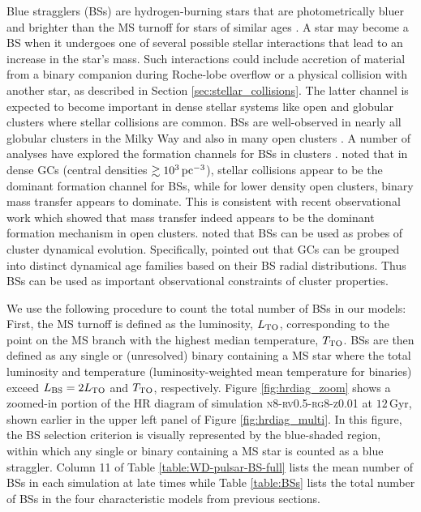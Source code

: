 \documentclass[twocolumn,tighten]{aastex63}
\begin{document}
Blue stragglers (BSs) are hydrogen-burning stars that are photometrically bluer and brighter than the MS turnoff for stars of similar ages \citep{Sandage1953}. A star may become a BS when it undergoes one of several possible stellar interactions that lead to an increase in the star's mass. Such interactions could include accretion of material from a binary companion during Roche-lobe overflow or a physical collision with another star, as described in Section \ref{sec:stellar_collisions}. The latter channel is expected to become important in dense stellar systems like open and globular clusters where stellar collisions are common. BSs are well-observed in nearly all globular clusters in the Milky Way \citep[e.g.,][]{Piotto2003,Ferraro2012} and also in many open clusters \citep[e.g.,][]{MathieuGeller2009}. A number of analyses have explored the formation channels for BSs in clusters \citep[e.g.][]{Ferraro2012,Chatterjee2013b,Hypki2017}. \citet{Chatterjee2013b} noted that in dense GCs (central densities $\gtrsim 10^3\,\rm{pc}^{-3}$), stellar collisions appear to be the dominant formation channel for BSs, while for lower density open clusters, binary mass transfer appears to dominate. This is consistent with recent observational work \citep[e.g.,][]{Geller2011,Gosnell2019} which showed that mass transfer indeed appears to be the dominant formation mechanism in open clusters. \citet{Ferraro2012} noted that BSs can be used as probes of cluster dynamical evolution. Specifically, \citet{Ferraro2012} pointed out that GCs can be grouped into distinct dynamical age families based on their BS radial distributions. Thus BSs can be used as important observational constraints of cluster properties.


We use the following procedure to count the total number of BSs in our models: First, the MS turnoff is defined as the luminosity, $L_{\rm{TO}}$, corresponding to the point on the MS branch with the highest median temperature, $T_{\rm{TO}}$. BSs are then defined as any single or (unresolved) binary containing a MS star where the total luminosity and temperature (luminosity-weighted mean temperature for binaries) exceed $L_{\rm{BS}} = 2 L_{\rm{TO}}$ and $T_{\rm{TO}}$, respectively. Figure \ref{fig:hrdiag_zoom} shows a zoomed-in portion of the HR diagram of simulation \textsc{n8-rv0.5-rg8-z0.01} at $12\,$Gyr, shown earlier in the upper left panel of Figure \ref{fig:hrdiag_multi}. In this figure, the BS selection criterion is visually represented by the blue-shaded region, within which any single or binary containing a MS star is counted as a blue straggler. Column 11 of Table \ref{table:WD-pulsar-BS-full} lists the mean number of BSs in each simulation at late times while Table \ref{table:BSs} lists the total number of BSs in the four characteristic models from previous sections.
\end{document}
